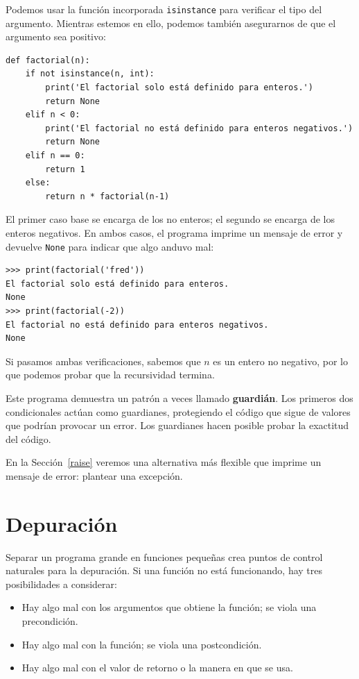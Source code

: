 \documentclass[10pt]{book}
\begin{document}
Podemos usar la función incorporada {\tt isinstance} para verificar el tipo
del argumento.  Mientras estemos en ello, podemos también asegurarnos de que el
argumento sea positivo:

\begin{verbatim}
def factorial(n):
    if not isinstance(n, int):
        print('El factorial solo está definido para enteros.')
        return None
    elif n < 0:
        print('El factorial no está definido para enteros negativos.')
        return None
    elif n == 0:
        return 1
    else:
        return n * factorial(n-1)
\end{verbatim}
%
El primer caso base se encarga de los no enteros; el
segundo se  encarga de los enteros negativos.  En ambos casos, el programa imprime
un mensaje de error y devuelve {\tt None} para indicar que algo
anduvo mal:

\begin{verbatim}
>>> print(factorial('fred'))
El factorial solo está definido para enteros.
None
>>> print(factorial(-2))
El factorial no está definido para enteros negativos.
None
\end{verbatim}
%
Si pasamos ambas verificaciones, sabemos que $n$ es un entero no negativo, por lo que podemos probar que la recursividad termina.

Este programa demuestra un patrón a veces llamado {\bf guardián}.
Los primeros dos condicionales actúan como guardianes, protegiendo el código que
sigue de valores que podrían provocar un error.  Los guardianes hacen
posible probar la exactitud del código.

En la Sección~\ref{raise} veremos una alternativa más flexible que imprime
un mensaje de error: plantear una excepción.


\section{Depuración}
\label{factdebug}

Separar un programa grande en funciones pequeñas crea puntos de control
naturales para la depuración.  Si una función no está
funcionando, hay tres posibilidades a considerar:

\begin{itemize}

\item Hay algo mal con los argumentos que obtiene
la función; se viola una precondición.

\item Hay algo mal con la función; se viola una
postcondición.

\item Hay algo mal con el valor de retorno o la
manera en que se usa.

\end{itemize}
\end{document}
